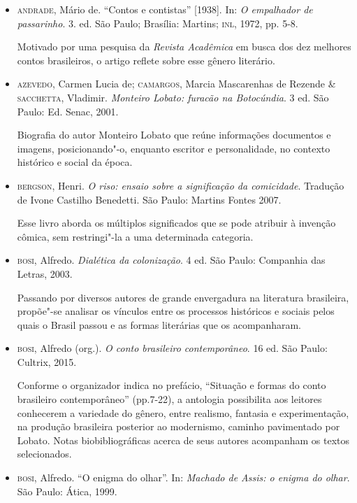 \documentclass[11pt]{extarticle}
\begin{document}
\begin{itemize}

\item  \textsc{andrade}, Mário de. ``Contos e contistas'' {[}1938{]}. In: \emph{O
empalhador de passarinho}. 3. ed. São Paulo; Brasília: Martins; \textsc{inl},
1972, pp. 5-8. 

Motivado por uma pesquisa da \emph{Revista Acadêmica} em
busca dos dez melhores contos brasileiros, o artigo reflete sobre esse
gênero literário.

\item  \textsc{azevedo}, Carmen Lucia de; \textsc{camargos}, Marcia Mascarenhas de Rezende \&
\textsc{sacchetta}, Vladimir. \emph{Monteiro Lobato: furacão na Botocúndia}. 3
ed. São Paulo: Ed. Senac, 2001.

Biografia do autor Monteiro Lobato que reúne informações documentos e imagens, 
posicionando"-o, enquanto escritor e personalidade, no contexto histórico e 
social da época. 

\item  \textsc{bergson}, Henri. \emph{O riso: ensaio sobre a significação da
comicidade}. Tradução de Ivone Castilho Benedetti. São Paulo: Martins
Fontes 2007.

Esse livro aborda os múltiplos significados que se pode atribuir à invenção cômica, 
sem restringi"-la a uma determinada categoria. 

\item  \textsc{bosi}, Alfredo. \emph{Dialética da colonização}. 4 ed. São Paulo:
Companhia das Letras, 2003.

Passando por diversos autores de grande envergadura na literatura brasileira, 
propõe"-se analisar os vínculos entre os processos históricos e sociais pelos 
quais o Brasil passou e as formas literárias que os acompanharam. 

\item  \textsc{bosi}, Alfredo (org.). \emph{O conto brasileiro contemporâneo}. 16 ed.
São Paulo: Cultrix, 2015. 

Conforme o organizador indica no prefácio, ``Situação e formas do conto brasileiro 
contemporâneo'' (pp.7-22), a antologia possibilita aos leitores conhecerem a 
variedade do gênero, entre realismo, fantasia e experimentação, na produção
brasileira posterior ao modernismo, caminho pavimentado por Lobato.
Notas biobibliográficas acerca de seus autores acompanham os textos
selecionados.

\item  \textsc{bosi}, Alfredo. ``O enigma do olhar''. In: \emph{Machado de Assis: o
enigma do olhar}. São Paulo: Ática, 1999.


\end{itemize}
\end{document}
